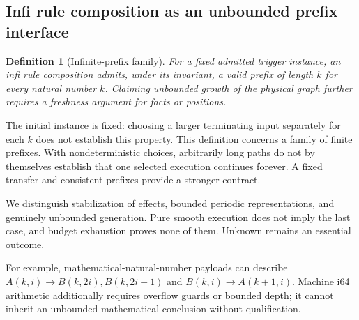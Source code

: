 \documentclass[11pt,a4paper]{article}
\newtheorem{definition}{Definition}
\begin{document}
\MathDissipative

\subsection{Infi rule composition as an unbounded prefix interface}
\begin{definition}[Infinite-prefix family]
For a fixed admitted trigger instance, an infi rule composition admits, under its
invariant, a valid prefix of length $k$ for every natural number $k$. Claiming unbounded growth of the physical
graph further requires a freshness argument for facts or positions.
\end{definition}

The initial instance is fixed: choosing a larger terminating input separately
for each $k$ does not establish this property. This definition concerns a family
of finite prefixes. With nondeterministic
choices, arbitrarily long paths do not by themselves establish that one selected
execution continues forever. A fixed transfer and consistent prefixes provide a
stronger contract.

We distinguish stabilization of effects, bounded periodic representations, and
genuinely unbounded generation. Pure smooth execution does not imply the last
case, and budget exhaustion proves none of them. Unknown remains an essential
outcome.

For example, mathematical-natural-number payloads can describe
$A(k,i)\to B(k,2i),B(k,2i+1)$ and $B(k,i)\to A(k+1,i)$.
Machine i64 arithmetic additionally requires overflow guards or bounded depth;
it cannot inherit an unbounded mathematical conclusion without qualification.
\end{document}
